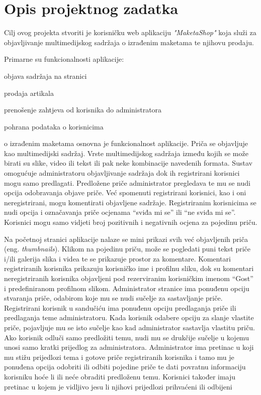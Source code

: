 \chapter{Opis projektnog zadatka}

		Cilj ovog projekta stvoriti je korisničku web aplikaciju \textit{"MaketaShop"} koja služi za objavljivanje multimedijskog sadržaja o izrađenim maketama te njihovu prodaju.
		
		Primarne su funkcionalnosti aplikacije: 
		\begin{packed_item}
			
			\item  objava sadržaja na stranici
			\item  prodaja artikala
			\item  prenošenje zahtjeva od korisnika do administratora
			\item  pohrana podataka o korisnicima
			
		\end{packed_item}
		
		
		 o izrađenim maketama osnovna je funkcionalnost aplikacije. Priča se objavljuje kao multimedijski sadržaj. Vrste multimedijskog sadržaja između kojih se može birati su slike, video ili tekst ili pak neke kombinacije navedenih formata. Sustav omogućuje administratoru objavljivanje sadržaja dok ih registrirani korisnici mogu samo predlagati. Predložene priče administrator pregledava te mu se nudi opcija odobravanja objave priče. Već spomenuti registrirani korisnici, kao i oni neregistrirani, mogu komentirati objavljene sadržaje. Registriranim korisnicima se nudi opcija i označavanja priče ocjenama “sviđa mi se” ili “ne sviđa mi se”. Korisnici mogu samo vidjeti broj pozitivnih i negativnih ocjena za pojedinu priču.
		
		Na početnoj stranici aplikacije nalaze se mini prikazi svih već objavljenih priča (eng. \textit{thumbnails}). Klikom na pojedinu priču, može se pogledati puni tekst priče i/ili galerija slika i videa te se prikazuje prostor za komentare. Komentari registriranih korisnika prikazuju korisničko ime i profilnu sliku, dok su komentari neregistriranih korisnika objavljeni pod rezerviranim korisničkim imenom “Gost” i predefiniranom profilnom slikom. Administrator stranice ima ponuđenu opciju stvaranja priče, odabirom koje mu se nudi sučelje za sastavljanje priče. Registrirani korisnik u sandučiću ima ponuđenu opciju predlaganja priče ili predlaganja teme administratoru. Kada korisnik odabere opciju za slanje vlastite priče, pojavljuje mu se isto sučelje kao kad administrator sastavlja vlastitu priču. Ako korisnik odluči samo predložiti temu, nudi mu se drukčije sučelje u kojemu unosi samo kratki prijedlog za administratora. Administrator ima pretinac u koji mu stižu prijedlozi tema i gotove priče registriranih korisnika i tamo mu je ponuđena opcija odobriti ili odbiti pojedine priče te dati povratnu informaciju korisniku hoće li ili neće obraditi predloženu temu. Korisnici također imaju pretinac u kojem je vidljivo jesu li njihovi prijedlozi prihvaćeni ili odbijeni
		
